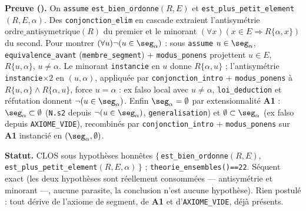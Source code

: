 \textbf{Preuve (\Nstar).} On \texttt{assume} \texttt{est\_bien\_ordonne}$(R,E)$ et \texttt{est\_plus\_petit\_element}$(R,E,\alpha)$. Des \texttt{conjonction\_elim} en cascade extraient l'antisymétrie $\mathrm{ordre\_antisymetrique}(R)$ du premier et le minorant $(\forall x)(x\in E\Rightarrow R\{\alpha,x\})$ du second. Pour montrer $(\forall u)\neg(u\in\seg_\alpha)$ : sous \texttt{assume} $u\in\seg_\alpha$, \texttt{equivalence\_avant} (\texttt{membre\_segment}) + \texttt{modus\_ponens} projettent $u\in E$, $R\{u,\alpha\}$, $u\neq\alpha$. Le minorant \texttt{instancie} en $u$ donne $R\{\alpha,u\}$ ; l'antisymétrie \texttt{instancie}$\times 2$ en $(u,\alpha)$, appliquée par \texttt{conjonction\_intro} + \texttt{modus\_ponens} à $R\{u,\alpha\}\wedge R\{\alpha,u\}$, force $u=\alpha$ : ex falso local avec $u\neq\alpha$, \texttt{loi\_deduction} et réfutation donnent $\neg(u\in\seg_\alpha)$. Enfin $\seg_\alpha=\emptyset$ par extensionnalité \textbf{A1} : $\seg_\alpha\subset\emptyset$ (\texttt{N.s2} depuis $\neg(u\in\seg_\alpha)$, \texttt{generalisation}) et $\emptyset\subset\seg_\alpha$ (ex falso depuis \texttt{AXIOME\_VIDE}), recombinés par \texttt{conjonction\_intro} + \texttt{modus\_ponens} sur \textbf{A1} instancié en $(\seg_\alpha,\emptyset)$.

\textbf{Statut.} CLOS sous hypothèses honnêtes $\{\,$\texttt{est\_bien\_ordonne}$(R,E)$, \texttt{est\_plus\_petit\_element}$(R,E,\alpha)\,\}$ ; \texttt{theorie\_ensembles()==22}. Séquent exact (les deux hypothèses sont réellement consommées --- antisymétrie et minorant ---, aucune parasite, la conclusion n'est aucune hypothèse). Rien postulé : tout dérive de l'axiome de segment, de \textbf{A1} et d'\texttt{AXIOME\_VIDE}, déjà présents.
